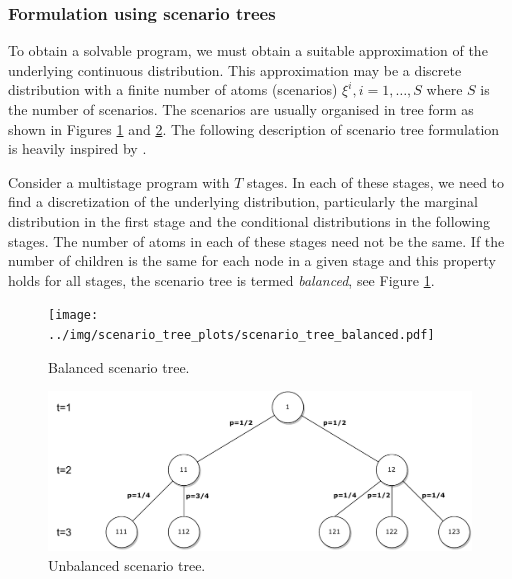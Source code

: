 \subsubsection{Formulation using scenario trees}
To obtain a solvable program, we must obtain a suitable approximation of the underlying continuous distribution. This approximation may be a discrete distribution with a finite number of atoms (scenarios) $\xi^i, i=1,\dots,S$ where $S$ is the number of scenarios. The scenarios are usually organised in tree form as shown in Figures \ref{fig:balanced_scenario_tree} and \ref{fig:unbalanced_scenario_tree}. The following description of scenario tree formulation is heavily inspired by \cite[Section 2]{dupacova_scenarios_for_multistage_stochastic_programs}.

Consider a multistage program with $T$ stages. In each of these stages, we need to find a discretization of the underlying distribution, particularly the marginal distribution in the first stage and the conditional distributions in the following stages. The number of atoms in each of these stages need not be the same. If the number of children is the same for each node in a given stage and this property holds for all stages, the scenario tree is termed \textit{balanced}, see Figure \ref{fig:balanced_scenario_tree}.

\begin{figure}[H]
  \texttt{[image: ../img/scenario\_tree\_plots/scenario\_tree\_balanced.pdf]}
  \caption{Balanced scenario tree.}
  \label{fig:balanced_scenario_tree}
\end{figure}


\begin{figure}[H]
  \includegraphics[width=\linewidth]{../img/scenario_tree_unbalanced.pdf}
  \caption{Unbalanced scenario tree.}
  \label{fig:unbalanced_scenario_tree}
\end{figure}

